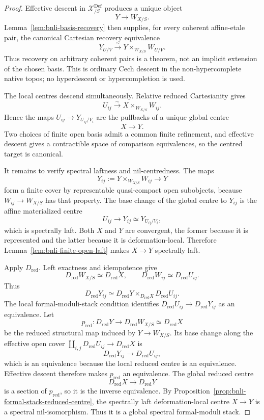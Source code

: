 \begin{proof}
Effective descent in $\mathcal X^{\mathrm{Def}}_{/S}$ produces a unique
object
\[
\boxed{
    Y\longrightarrow W_{X/S}.}
\]
Lemma~\ref{lem:bnli-basis-recovery} then supplies, for every coherent
affine-etale pair, the canonical Cartesian recovery equivalence
\[
\boxed{
    Y_{U/V}
    \xrightarrow{\sim}
    Y\times_{W_{X/S}}W_{U/V}.}
\]
Thus recovery on arbitrary coherent pairs is a theorem, not an implicit
extension of the chosen basis.  This is ordinary Cech descent in the
non-hypercomplete native topos; no hyperdescent or hypercompletion is used.

The local centres descend simultaneously.  Relative reduced Cartesianity
gives
\[
    U_{ij}
    \xrightarrow{\sim}
    X\times_{W_{X/S}}W_{ij}.
\]
Hence the maps $U_{ij}\to Y_{U_{ij}/V_i}$ are the pullbacks of a unique
global centre
\[
\boxed{
    X\longrightarrow Y.}
\]
Two choices of finite open basis admit a common finite refinement, and
effective descent gives a contractible space of comparison equivalences, so
the centred target is canonical.

It remains to verify spectral laftness and nil-centredness.  The maps
\[
    Y_{ij}:=Y\times_{W_{X/S}}W_{ij}\longrightarrow Y
\]
form a finite cover by representable quasi-compact open subobjects, because
$W_{ij}\to W_{X/S}$ has that property.  The base change of the global centre
to $Y_{ij}$ is the affine materialized centre
\[
    U_{ij}\longrightarrow Y_{ij}\simeq Y_{U_{ij}/V_i},
\]
which is spectrally laft.  Both $X$ and $Y$ are convergent, the former because
it is represented and the latter because it is deformation-local.  Therefore
Lemma~\ref{lem:bnli-finite-open-laft} makes $X\to Y$ spectrally laft.

Apply $D_{\mathrm{red}}$.  Left exactness and idempotence give
\[
    D_{\mathrm{red}}W_{X/S}\simeq D_{\mathrm{red}}X,
    \qquad
    D_{\mathrm{red}}W_{ij}\simeq D_{\mathrm{red}}U_{ij}.
\]
Thus
\[
    D_{\mathrm{red}}Y_{ij}
    \simeq
    D_{\mathrm{red}}Y
    \times_{D_{\mathrm{red}}X}
    D_{\mathrm{red}}U_{ij}.
\]
The local formal-moduli-stack condition identifies
$D_{\mathrm{red}}U_{ij}\to D_{\mathrm{red}}Y_{ij}$ as an equivalence.  Let
\[
    p_{\mathrm{red}}:
    D_{\mathrm{red}}Y
    \longrightarrow
    D_{\mathrm{red}}W_{X/S}
    \simeq
    D_{\mathrm{red}}X
\]
be the reduced structural map induced by $Y\to W_{X/S}$.  Its base change
along the effective open cover
$\coprod_{i,j}D_{\mathrm{red}}U_{ij}\to D_{\mathrm{red}}X$ is
\[
    D_{\mathrm{red}}Y_{ij}
    \longrightarrow
    D_{\mathrm{red}}U_{ij},
\]
which is an equivalence because the local reduced centre is an equivalence.
Effective descent therefore makes $p_{\mathrm{red}}$ an equivalence.  The
global reduced centre
\[
    D_{\mathrm{red}}X\longrightarrow D_{\mathrm{red}}Y
\]
is a section of $p_{\mathrm{red}}$, so it is the inverse equivalence.  By
Proposition~\ref{prop:bnli-formal-stack-reduced-centre}, the spectrally laft
deformation-local centre $X\to Y$ is a spectral nil-isomorphism.  Thus it is a
global spectral formal-moduli stack.


\end{proof}
